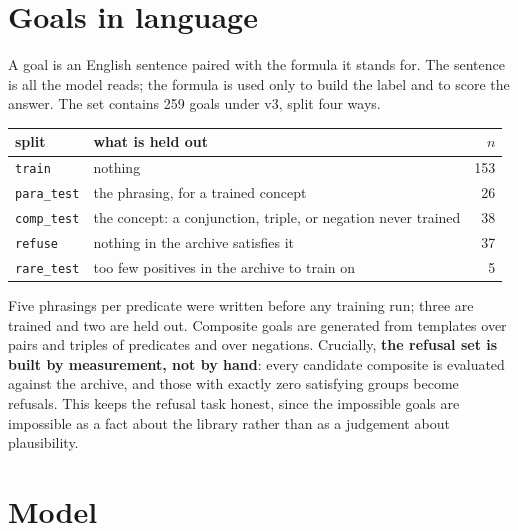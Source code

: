 \documentclass[11pt]{article}
\begin{document}
\section{Goals in language}

A goal is an English sentence paired with the formula it stands for. The sentence is all
the model reads; the formula is used only to build the label and to score the answer.
The set contains 259 goals under v3, split four ways.

\begin{center}
\begin{tabular}{llr}
\toprule
split & what is held out & $n$ \\
\midrule
\texttt{train} & nothing & 153 \\
\texttt{para\_test} & the phrasing, for a trained concept & 26 \\
\texttt{comp\_test} & the concept: a conjunction, triple, or negation never trained & 38 \\
\texttt{refuse} & nothing in the archive satisfies it & 37 \\
\texttt{rare\_test} & too few positives in the archive to train on & 5 \\
\bottomrule
\end{tabular}
\end{center}

Five phrasings per predicate were written before any training run; three are trained and
two are held out. Composite goals are generated from templates over pairs and triples of
predicates and over negations. Crucially, \textbf{the refusal set is built by
measurement, not by hand}: every candidate composite is evaluated against the archive,
and those with exactly zero satisfying groups become refusals. This keeps the refusal
task honest, since the impossible goals are impossible as a fact about the library
rather than as a judgement about plausibility.

\section{Model}
\label{sec:model}
\end{document}
